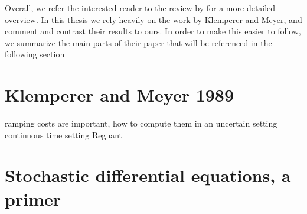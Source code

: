 Overall, we refer the interested reader to the review by \cite{ventosa2005electricity} for a more detailed overview. In this thesis we rely heavily on the work by Klemperer and Meyer, and comment and contrast their results to ours. In order to make this easier to follow, we summarize the main parts of their paper that will be referenced in the following section

\section{Klemperer and Meyer 1989}



ramping costs are important, how to compute them in an uncertain setting
continuous time setting Reguant
\section{Stochastic differential equations, a primer}









%


 